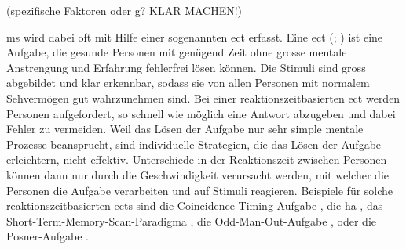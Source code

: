 \documentclass[11pt, twoside, a4paper]{book}		%
\begin{document}
(spezifische Faktoren oder g? KLAR MACHEN!)


\gls{ms} wird dabei oft mit Hilfe einer sogenannten \gls{ect} erfasst. 
Eine \gls{ect} (\citealp[S. 11]{Carroll1993}; \citealp[S. 203--209]{Jensen1998b}) ist eine Aufgabe, die gesunde Personen mit genügend Zeit ohne grosse mentale Anstrengung und Erfahrung fehlerfrei lösen können. Die Stimuli sind gross abgebildet und klar erkennbar, sodass sie von allen Personen mit normalem Sehvermögen gut wahrzunehmen sind. 
Bei einer reaktionszeitbasierten \gls{ect} werden Personen aufgefordert, so schnell wie möglich eine Antwort abzugeben und dabei Fehler zu vermeiden. 
Weil das Lösen der Aufgabe nur sehr simple mentale Prozesse beansprucht, sind individuelle Strategien, die das Lösen der Aufgabe erleichtern, nicht effektiv. Unterschiede in der Reaktionszeit zwischen Personen können dann nur durch die Geschwindigkeit verursacht werden, mit welcher die Personen die Aufgabe verarbeiten und auf Stimuli reagieren.
Beispiele für solche reaktionszeitbasierten \glspl{ect} sind
die Coincidence-Timing-Aufgabe \citep[bei welcher eine zeitliches Zusammentreffen von zwei Stimuli so rasch als möglich erkannt werden muss;][]{Smith1987a}, 
die \gls{ha} \citep[zur Erfassung einfacher Reaktionszeit und der Reaktionszeit für eine Mehrfachauswahl;][]{Hick1952}, 
das Short-Term-Memory-Scan-Paradigma \citep[zur Erfassung der benötigten Zeit für einen Zugriff auf das Kurzzeitgedächtnis;][]{Sternberg1966, Sternberg1969},
die Odd-Man-Out-Aufgabe \citep[zur Erfassung der Reaktionszeit für eine Mehrfachauswahl;][]{Frearson1986}, 
oder die Posner-Aufgabe \citep[zur Erfassung der benötigten Zeit für einen Zugriff auf das Langzeitgedächtnis;][]{Posner1969}.

\end{document}
